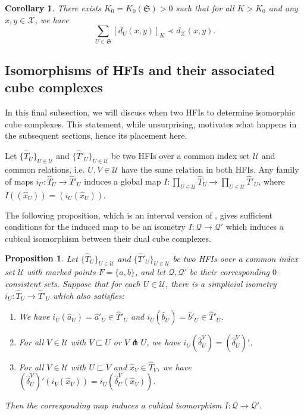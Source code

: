\documentclass{amsart}
\newtheorem{proposition}[theorem]{Proposition}
\newtheorem{corollary}[theorem]{Corollary}
\theoremstyle{definition}
\theoremstyle{remark}
\theoremstyle{definition}
\newcommand{\calQ}{\mathcal{Q}}
\newcommand{\calU}{\mathcal{U}}
\newcommand{\calX}{\mathcal{X}}
\newcommand{\hT}{\widehat{T}}
\newcommand{\hx}{\hat{x}}
\newcommand{\ha}{\hat{a}}
\newcommand{\hb}{\hat{b}}
\newcommand{\hd}{\hat{\delta}}
\newcommand{\nest}{\sqsubset}
\begin{document}
\begin{corollary}\label{cor:DF lower bound}
There exists $K_0 = K_0(\mathfrak S)>0$ such that for all $K>K_0$ and any $x, y \in \calX$, we have
$$\sum_{U \in \mathfrak S} \left[d_U(x,y)\right]_K \prec d_{\calX}(x,y).$$
\end{corollary}

\subsection{Isomorphisms of HFIs and their associated cube complexes}

In this final subsection, we will discuss when two HFIs to determine isomorphic cube complexes.  This statement, while unsurprising, motivates what happens in the subsequent sections, hence its placement here.

Let $\{\hT_U\}_{U \in \calU}$ and $\{\hT'_U\}_{U \in \calU}$ be two HFIs over a common index set $\calU$ and common relations, i.e. $U,V \in \calU$ have the same relation in both HFIs.  Any family of maps $i_U:\hT_U \to \hT'_U$ induces a global map $I:\prod_{U \in \calU} \hT_U \to \prod_{U \in \calU} \hT'_U$, where $I((\hx_U)) = (i_U(\hx_U))$.

The following proposition, which is an interval version of \cite[Proposition 14.12]{Dur_infcube}, gives sufficient conditions for the induced map to be an isometry $I:\calQ \to \calQ'$ which induces a cubical isomorphism between their dual cube complexes.

\begin{proposition}\label{prop:HFI isomorphism}
Let $\{\hT_U\}_{U \in \calU}$ and $\{\hT'_U\}_{U \in \calU}$ be two HFIs over a common index set $\calU$ with marked points $F = \{a,b\}$, and let $\calQ, \calQ'$ be their corresponding $0$-consistent sets.  Suppose that for each $U \in \calU$, there is a simplicial isometry $i_U:\hT_U \to \hT'_U$ which also satisfies:
\begin{enumerate}
	\item We have $i_U(\ha_U) = \ha'_U \in \hT'_U$ and $i_U(\hb_U) = \hb'_U \in \hT'_U$.
	\item For all $V  \in \calU$ with $V \nest U$ or $V \pitchfork U$, we have $i_U(\hd^V_U) = \left(\hd^V_U\right)'$.
	\item For all $V \in \calU$ with $U \nest V$ and $\hx_V \in \hT_V$, we have $\left(\hd^V_U\right)'(i_V(\hx_V)) = i_U(\hd^V_U(\hx_V))$.
\end{enumerate}
Then the corresponding map induces a cubical isomorphism $I:\calQ \to \calQ'$.
\end{proposition}
\end{document}
